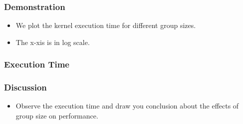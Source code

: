 \documentclass{beamer}
\begin{document}
\begin{frame}
\end{frame}

\begin{frame}
  \frametitle{Demonstration}
  \begin{itemize}
    \item We plot the kernel execution time for different group sizes.
    \item The x-xis is in log scale.
  \end{itemize}
\end{frame}

\begin{frame}
  \frametitle{Execution Time}
  \centerline{}
\end{frame}

\begin{frame}
  \frametitle{Discussion}
  \begin{itemize}
    \item Observe the execution time and draw you conclusion about the
      effects of group size on performance.
  \end{itemize}
\end{frame}
\end{document}
